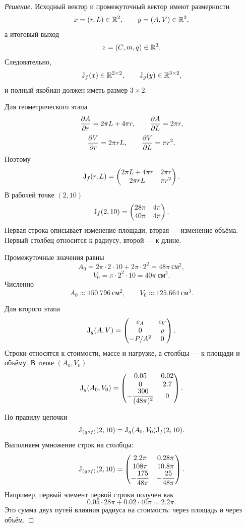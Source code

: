 \begin{proof}[Решение]
Исходный вектор и промежуточный вектор имеют размерности
\[
x=(r,L)\in\mathbb{R}^2,
\qquad
y=(A,V)\in\mathbb{R}^2,
\]
а итоговый выход
\[
z=(C,m,q)\in\mathbb{R}^3.
\]
Следовательно,
\[
\mathrm{J}_{f}(x)\in\mathbb{R}^{2\times2},
\qquad
\mathrm{J}_{g}(y)\in\mathbb{R}^{3\times2},
\]
и полный якобиан должен иметь размер \(3\times2\).

Для геометрического этапа
\[
\frac{\partial A}{\partial r}=2\pi L+4\pi r,
\qquad
\frac{\partial A}{\partial L}=2\pi r,
\]
\[
\frac{\partial V}{\partial r}=2\pi rL,
\qquad
\frac{\partial V}{\partial L}=\pi r^2.
\]
Поэтому
\begin{equation}
\mathrm{J}_{f}(r,L)
=
\begin{pmatrix}
2\pi L+4\pi r & 2\pi r\\
2\pi rL & \pi r^2
\end{pmatrix}.
\label{eq:cylinder-geometry-jacobian}
\end{equation}
В рабочей точке \((2,10)\)
\[
\mathrm{J}_{f}(2,10)
=
\begin{pmatrix}
28\pi & 4\pi\\
40\pi & 4\pi
\end{pmatrix}.
\]
Первая строка описывает изменение площади, вторая --- изменение объёма. Первый столбец относится к радиусу, второй --- к длине.

Промежуточные значения равны
\[
A_0=2\pi\cdot2\cdot10+2\pi\cdot2^2=48\pi\ \text{см}^2,
\]
\[
V_0=\pi\cdot2^2\cdot10=40\pi\ \text{см}^3.
\]
Численно
\[
A_0\approx150.796\ \text{см}^2,
\qquad
V_0\approx125.664\ \text{см}^3.
\]

Для второго этапа
\[
\mathrm{J}_{g}(A,V)
=
\begin{pmatrix}
 c_A & c_V\\
 0 & \rho\\
 -P/A^2 & 0
\end{pmatrix}.
\]
Строки относятся к стоимости, массе и нагрузке, а столбцы --- к площади и объёму. В точке \((A_0,V_0)\)
\[
\mathrm{J}_{g}(A_0,V_0)
=
\begin{pmatrix}
0.05 & 0.02\\
0 & 2.7\\
-\dfrac{300}{(48\pi)^2} & 0
\end{pmatrix}.
\]

По правилу цепочки
\[
\mathrm{J}_{(g\circ f)}(2,10)
=
\mathrm{J}_{g}(A_0,V_0)\mathrm{J}_{f}(2,10).
\]
Выполняем умножение строк на столбцы:
\begin{equation}
\mathrm{J}_{(g\circ f)}(2,10)
=
\begin{pmatrix}
2.2\pi & 0.28\pi\\
108\pi & 10.8\pi\\
-\dfrac{175}{48\pi} & -\dfrac{25}{48\pi}
\end{pmatrix}.
\label{eq:cylinder-total-jacobian}
\end{equation}
Например, первый элемент первой строки получен как
\[
0.05\cdot28\pi+0.02\cdot40\pi=2.2\pi.
\]
Это сумма двух путей влияния радиуса на стоимость: через площадь и через объём.


\end{proof}
